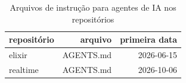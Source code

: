 \begin{table}[htbp]
\centering
\caption{Arquivos de instrução para agentes de IA nos repositórios}
\label{tab:ai_repo_files}
\begin{tabular}{lrr}
\toprule
repositório & arquivo & primeira data \\
\midrule
elixir & AGENTS.md & 2026-06-15 \\
realtime & AGENTS.md & 2026-10-06 \\
\bottomrule
\end{tabular}
\end{table}
